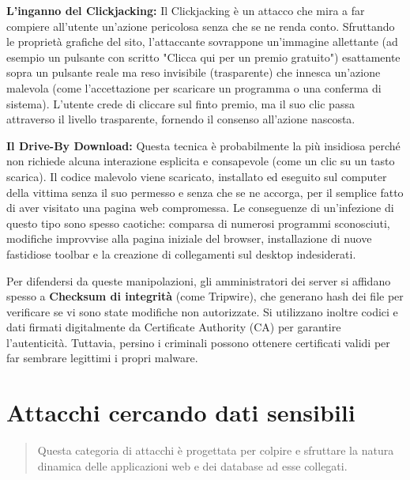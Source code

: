 \documentclass{article}
\begin{document}
\vspace{0.3cm}
\noindent \textbf{L'inganno del Clickjacking:} Il Clickjacking è un attacco che mira a far compiere all'utente un'azione pericolosa senza che se ne renda conto. Sfruttando le proprietà grafiche del sito, l'attaccante sovrappone un'immagine allettante (ad esempio un pulsante con scritto "Clicca qui per un premio gratuito") esattamente sopra un pulsante reale ma reso invisibile (trasparente) che innesca un'azione malevola (come l'accettazione per scaricare un programma o una conferma di sistema). L'utente crede di cliccare sul finto premio, ma il suo clic passa attraverso il livello trasparente, fornendo il consenso all'azione nascosta.

\vspace{0.3cm}
\noindent \textbf{Il Drive-By Download:} Questa tecnica è probabilmente la più insidiosa perché non richiede alcuna interazione esplicita e consapevole (come un clic su un tasto scarica). Il codice malevolo viene scaricato, installato ed eseguito sul computer della vittima senza il suo permesso e senza che se ne accorga, per il semplice fatto di aver visitato una pagina web compromessa. Le conseguenze di un'infezione di questo tipo sono spesso caotiche: comparsa di numerosi programmi sconosciuti, modifiche improvvise alla pagina iniziale del browser, installazione di nuove fastidiose toolbar e la creazione di collegamenti sul desktop indesiderati.

\vspace{0.3cm}
Per difendersi da queste manipolazioni, gli amministratori dei server si affidano spesso a \textbf{Checksum di integrità} (come Tripwire), che generano hash dei file per verificare se vi sono state modifiche non autorizzate. Si utilizzano inoltre codici e dati firmati digitalmente da Certificate Authority (CA) per garantire l'autenticità. Tuttavia, persino i criminali possono ottenere certificati validi per far sembrare legittimi i propri malware.

\vspace{0.8cm}

\section*{Attacchi cercando dati sensibili}

\begin{quote}
    Questa categoria di attacchi è progettata per colpire e sfruttare la natura dinamica delle applicazioni web e dei database ad esse collegati.
\end{quote}
\end{document}
